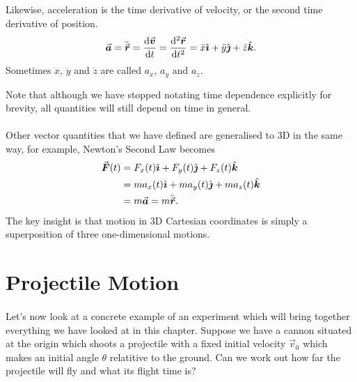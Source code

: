 \documentclass[../newtonian_mechanics.tex]{subfiles}
\begin{document}
        \begin{definition}
            Likewise, acceleration is the time derivative of velocity, or the second time derivative of position.
            \begin{equation}
                \vec{\boldsymbol a}=\ddot{\vec{\boldsymbol r}}=\frac{\mathrm{d}\vec{\boldsymbol v}}{\mathrm{d}t}=\frac{\mathrm{d}^2\vec{\boldsymbol r}}{\mathrm{d}t^2}=\ddot{x}\hat{\boldsymbol{\imath}}+\ddot{y}\hat{\boldsymbol{\jmath}}+\ddot{z}\hat{\boldsymbol{k}}.
            \end{equation}
            Sometimes $\ddot{x}$, $\ddot{y}$ and $\ddot{z}$ are called $a_x$, $a_y$ and $a_z$.
        \end{definition}
        Note that although we have stopped notating time dependence explicitly for brevity, all quantities will still depend on time in general.

        \paragraph{}
        Other vector quantities that we have defined are generalised to 3D in the same way, for example, Newton's Second Law becomes
        \begin{align*}
            \vec{\boldsymbol F}(t)&=F_x(t)\hat{\boldsymbol{\imath}}+F_y(t)\hat{\boldsymbol{\jmath}}+F_z(t)\hat{\boldsymbol{k}}\\
            &=ma_x(t)\hat{\boldsymbol{\imath}}+ma_y(t)\hat{\boldsymbol{\jmath}}+ma_z(t)\hat{\boldsymbol{k}} \\
            &=m\vec{\boldsymbol a}=m\ddot{\vec{\boldsymbol r}}.
        \end{align*}
        The key insight is that motion in 3D Cartesian coordinates is simply a superposition of three one-dimensional motions.

    \section{Projectile Motion}
        \paragraph{}
        Let's now look at a concrete example of an experiment which will bring together everything we have looked at in this chapter.
        Suppose we have a cannon situated at the origin which shoots a projectile with a fixed initial velocity $\vec{v}_0$ which makes an initial angle $\theta$ relatitive to the ground.
        Can we work out how far the projectile will fly and what its flight time is?
\end{document}
